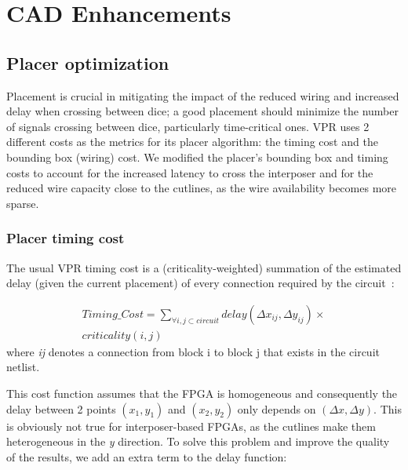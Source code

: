 \documentclass{sig-alternate-2013}
\begin{document}
\section{CAD Enhancements}
\label{cadSection}

\subsection{Placer optimization}
\label{cad_enh_placer_subsection}
Placement is crucial in mitigating the impact of the reduced wiring and increased delay when crossing between dice; a good placement should minimize the number of signals crossing between dice, particularly time-critical ones. VPR uses 2 different costs as the metrics for its placer algorithm: the timing cost and the bounding box (wiring) cost. We modified the placer's bounding box and timing costs to account for the increased latency to cross the interposer and for the reduced wire capacity close to the cutlines, as the wire availability becomes more sparse.

\subsubsection{Placer timing cost}
The usual VPR timing cost is a (criticality-weighted) summation of the estimated delay (given the current placement) of every connection required by the circuit~\cite{timing2000}:

\begin{equation} \label{eq:timing_eq_full}
\begin{split}
Timing\_Cost = \sum_{\forall i, j \subset circuit} delay(\Delta x_{ij},\Delta y_{ij}) \times \\ 
criticality(i,j)
\end{split}
\end{equation}
where \textit{ij} denotes a connection from block i to block j that exists in the circuit netlist.

This cost function assumes that the FPGA is homogeneous and consequently the delay between 2 points $(x_1,y_1)$ and $(x_2,y_2)$ only depends on $(\Delta x,\Delta y)$. This is obviously not true for interposer-based FPGAs, as the cutlines make them heterogeneous in the \textit{y} direction. To solve this problem and improve the quality of the results, we add an extra term to the delay function:
\end{document}
